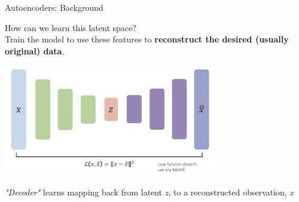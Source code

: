 \documentclass[serif, aspectratio=169]{beamer}
\begin{document}
\begin{frame}{Autoencoders: Background}

    How can we learn this latent space? \\
    Train the model to use these features to \textbf{reconstruct the desired (usually original) data}.


    \begin{center}
                
        \includegraphics[width=0.7\textwidth]{pic/AE background2.png} 

        
        \textit{"Decoder"} learns mapping back from latent \textit{z}, to a reconstructed observation, \textit{x}
    \end{center}
\end{frame}
\end{document}
